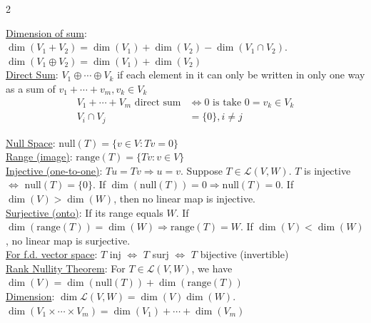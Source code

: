 \documentclass[a4paper,8pt]{extarticle} %
\begin{document}
\begin{multicols*}{2}
{\underline{Dimension of sum}: $\dim(V_1+V_2)=\dim(V_1)+\dim(V_2)-\dim(V_1\cap V_2)$. $\dim(V_1\oplus V_2)=\dim(V_1)+\dim(V_2)$\\

\underline{Direct Sum}: $V_1\oplus\cdots\oplus V_k$ if each element in it can only be written in only one way as a sum of $v_1+\cdots+v_m, v_k\in V_k$
\begin{subequations}
    \begin{align}
        V_1+\cdots+V_m \text{ direct sum}&\Leftrightarrow \text{$0$ is take $0=v_k\in V_k$}\\
        V_i\cap V_j&= \{0\}, i\neq j
    \end{align}
\end{subequations}

\underline{Null Space}: $\text{null}(T)=\{v\in V: Tv=0\}$\\

\underline{Range (image)}: $\text{range}(T)=\{Tv:v\in V\}$\\

\underline{Injective (one-to-one)}: $Tu=Tv \Rightarrow u = v$. Suppose $T\in \mathcal{L}(V, W)$. $T$ is injective $\Leftrightarrow$ $\text{null}(T)=\{0\}$. If $\dim(\text{null}(T))=0\Rightarrow\text{null}(T)=0$. If $\dim(V)>\dim(W)$, then no linear map is injective.\\

\underline{Surjective (onto)}: If its range equals $W$. If $\dim(\text{range}(T))=\dim(W)\Rightarrow\text{range}(T)=W$. If $\dim(V)<\dim(W)$, no linear map is surjective.\\

\underline{For f.d. vector space}: $T$ inj $\Leftrightarrow$ $T$ surj $\Leftrightarrow$ $T$ bijective (invertible)\\

\underline{Rank Nullity Theorem}: For $T\in\mathcal{L}(V, W)$, we have
$\dim(V)=\dim(\text{null}(T))+\dim(\text{range}(T))$\\

\underline{Dimension}: $\dim\mathcal{L}(V, W)=\dim(V)\dim(W)$. $\dim(V_1\times\cdots\times V_m)=\dim(V_1)+\cdots+\dim(V_m)$\\
}


\end{multicols*}

\end{document}

